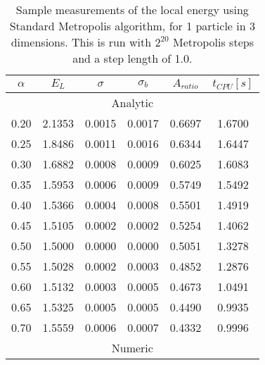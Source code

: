 \documentclass[
    a4paper, aps, twocolumn, floatfix, superscriptaddress,
    nofootinbib]{revtex4-1}
\begin{document}
\begin{table}[h!]
\caption{Sample measurements of the local energy using Standard Metropolis algorithm, for 1 particle in 3 dimensions. This is run with $2^{20}$ Metropolis steps and a step length of 1.0.}
\label{tab:b_bruteforce_1part_3dim}

\centering
\begin{ruledtabular}
\begin{tabular}{cccccc}
$\alpha$ & $E_L$  & $\sigma$ & $\sigma_b$ & $A_{ratio}$ & $t_{CPU}[\si{s}]$  \\
\hline
          \multicolumn{6}{c}{Analytic}\\
\hline

0.20     & 2.1353 & 0.0015   & 0.0017     & 0.6697      & 1.6700    \\
0.25     & 1.8486 & 0.0011   & 0.0016     & 0.6344      & 1.6447     \\
0.30     & 1.6882 & 0.0008   & 0.0009     & 0.6025      & 1.6083     \\
0.35     & 1.5953 & 0.0006   & 0.0009     & 0.5749      & 1.5492     \\
0.40     & 1.5366 & 0.0004   & 0.0008     & 0.5501      & 1.4919     \\
0.45     & 1.5105 & 0.0002   & 0.0002     & 0.5254      & 1.4062      \\
0.50     & 1.5000 & 0.0000   & 0.0000     & 0.5051      & 1.3278    \\
0.55     & 1.5028 & 0.0002   & 0.0003     & 0.4852      & 1.2876    \\
0.60     & 1.5132 & 0.0003   & 0.0005     & 0.4673      & 1.0491      \\
0.65     & 1.5325 & 0.0005   & 0.0005     & 0.4490      & 0.9935     \\
0.70     & 1.5559 & 0.0006   & 0.0007     & 0.4332      & 0.9996    \\
\hline
         \multicolumn{6}{c}{Numeric}                                                     \\
\hline


\end{tabular}
\end{ruledtabular}
\end{table}
\end{document}
